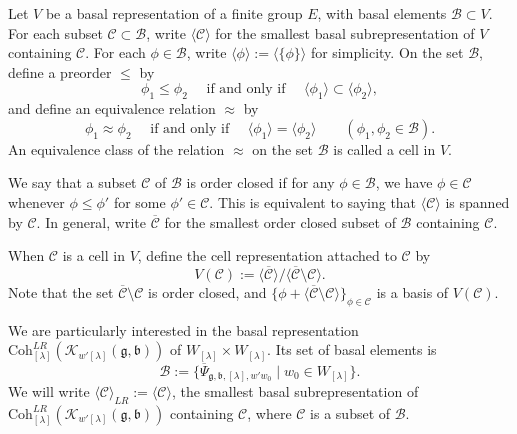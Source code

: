 \documentclass[12pt,a4paper]{amsart}
\newcommand{\CB}{{\mathcal {B}}}
\newcommand{\CC}{{\mathcal {C}}}
\newcommand{\CK}{{\mathcal {K}}}
\newcommand{\g}{\mathfrak g}
\renewcommand{\b}{\mathfrak b}
\newcommand{\la}{\langle}
\newcommand{\ra}{\rangle}
\numberwithin{equation}{section}
\newtheorem{lem}[thm]{Lemma}
\theoremstyle{remark}
\def\Coh{\mathrm{Coh}}
\newcommand{\Lam}{{[\lambda]}}
\begin{document}
Let $V$ be a basal representation of a finite group $E$, with basal elements $\CB\subset V$. For each subset $\mathcal C\subset \CB$, write $\la \CC\ra$ for the smallest basal subrepresentation of $V$ containing $\CC$. For each $\phi\in \CB$, write $\la \phi\ra:=\la \{\phi\}\ra$ for simplicity. On the set $\CB$, define a preorder $\leq$ by
\[
  \phi_1\leq \phi_2  \quad \textrm{ if and only if } \quad \la \phi_1\ra \subset \la \phi_2 \ra,
\]
and define an equivalence relation $\approx$ by
\[
  \phi_1 \approx \phi_2  \quad \textrm{ if and only if } \quad \la \phi_1 \ra =\la \phi_2 \ra \qquad (\phi_1, \phi_2\in \CB).
\]
An equivalence class of the relation $\approx$ on the set $\CB$ is called a cell in $V$.

We say that a subset $\CC$ of $\CB$ is order closed if for any $\phi\in \CB$, we have $\phi\in \CC$ whenever $\phi\leq \phi'$ for some $\phi'\in \CC$.
This is equivalent to saying that $\la \CC\ra$ is spanned by $\CC$. In general, write $\overline \CC$ for the smallest order closed subset of $\CB$ containing $\CC$.

When $\CC$ is a cell in $V$, define the cell representation attached to $\CC$ by
\[
  V(\CC):=\la \overline \CC \ra/ \la \overline \CC\setminus \CC\ra.
\]
Note that the set $ \overline \CC\setminus \CC$ is order closed, and $\{\phi+ \la \overline \CC\setminus \CC\ra\}_{ \phi\in \CC}$ is a basis of $V(\CC)$.




We are particularly interested in the basal representation $\Coh^{LR}_{\Lam}( \CK_{ w'\Lam}(\g,\b))$ of $W_\Lam\times W_\Lam$. Its set of basal elements is
\[
  \CB:= \{ \overline \Psi_{\g,\b, \Lam, w'w_0}\mid w_0\in W_\Lam\}.
\]
We will write
 $ \la \CC\ra_{LR}:=\la \CC \ra $, the smallest basal subrepresentation of $\Coh^{LR}_{\Lam}( \CK_{ w'\Lam}(\g,\b))$ containing $\CC$, where $\CC$ is a subset of $\CB$.

\end{document}
